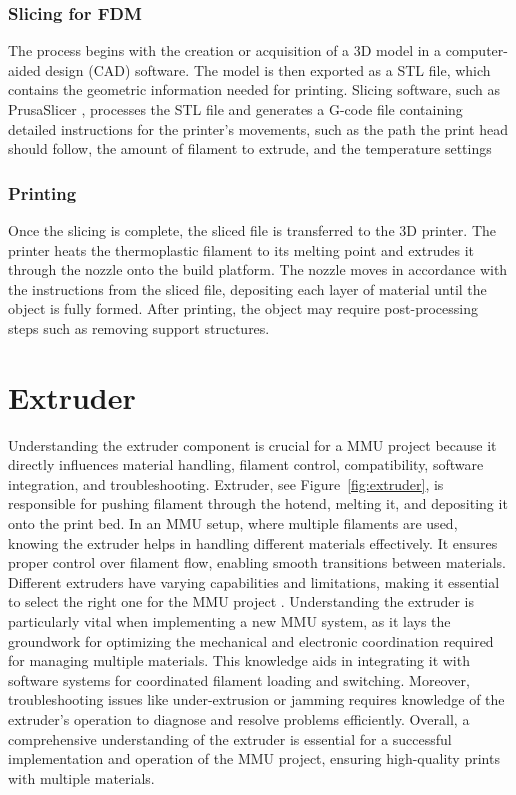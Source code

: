 \subsubsection{Slicing for FDM}
The process begins with the creation or acquisition of a 3D model in a computer-aided design (CAD) software. The model is then exported as a STL \cite{stl} file, which contains the geometric information needed for printing.
Slicing software, such as PrusaSlicer \cite{slicer}, processes the STL file and generates a G-code \cite{gcode} file containing detailed instructions for the printer's movements, such as the path the print head should follow, the amount of filament to extrude, and the temperature settings

\subsubsection{Printing}
Once the slicing is complete, the sliced file is transferred to the 3D printer. The printer heats the thermoplastic filament to its melting point and extrudes it through the nozzle onto the build platform. The nozzle moves in accordance with the instructions from the sliced file, depositing each layer of material until the object is fully formed. After printing, the object may require post-processing steps such as removing support structures.


\section{Extruder}

Understanding the extruder component is crucial for a MMU project because it directly influences material handling, filament control, compatibility, software integration, and troubleshooting. Extruder, see Figure~\ref{fig:extruder}, is responsible for pushing filament through the hotend, melting it, and depositing it onto the print bed. In an MMU setup, where multiple filaments are used, knowing the extruder helps in handling different materials effectively. It ensures proper control over filament flow, enabling smooth transitions between materials. Different extruders have varying capabilities and limitations, making it essential to select the right one for the MMU project \cite{3d-print-basics}. Understanding the extruder is particularly vital when implementing a new MMU system, as it lays the groundwork for optimizing the mechanical and electronic coordination required for managing multiple materials. This knowledge aids in integrating it with software systems for coordinated filament loading and switching. Moreover, troubleshooting issues like under-extrusion or jamming requires knowledge of the extruder's operation to diagnose and resolve problems efficiently. Overall, a comprehensive understanding of the extruder is essential for a successful implementation and operation of the MMU project, ensuring high-quality prints with multiple materials.

